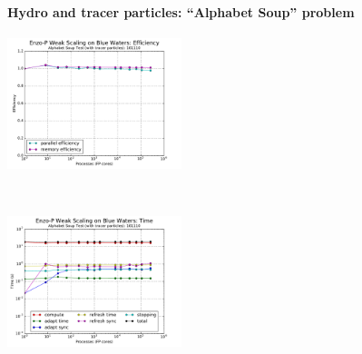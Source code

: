 \begin{frame}[fragile]
 \secframetitle{\ssScaling}
  \framesubtitle{Hydro and tracer particles: ``Alphabet Soup'' problem}
\begin{center}
  \vspace{-0.1in}
  \begin{minipage}{4.50in}
    \begin{center}
      \begin{minipage}{2in}
    \includegraphics[width=2.0in]{Images/Scaling/scaling-efficiency-161110.pdf}
    \end{minipage} \ 
      \begin{minipage}{2in}
    \includegraphics[width=2.0in]{Images/Scaling/scaling-time-161110.pdf}
    \end{minipage} \\
    \end{center}
  \end{minipage} \\
\end{center}
\end{frame}


